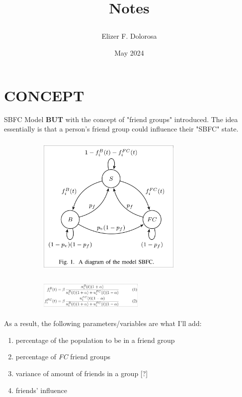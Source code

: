 \documentclass{article}
\title{

  Notes
}
\author{Elizer F. Dolorosa}
\date{May 2024}
\begin{document}
\maketitle

\section{CONCEPT}
SBFC Model \textbf{BUT} with the concept of "friend groups" introduced. The idea essentially is that a person's friend group could influence their "SBFC" state.

\begin{figure}[h]
  \begin{subfigure}{0.57\textwidth}
    \includegraphics[align=c,width=6.9cm, height=7cm]{sbfc-diagram.png}
  \end{subfigure}
  \begin{subfigure}{0.42\textwidth}
    \includegraphics[align=c,width=5cm, height=1.5cm]{transmission-eq.png}
  \end{subfigure}
\end{figure}

As a result, the following parameters/variables are what I'll add:
\begin{enumerate}
  \item percentage of the population to be in a friend group
  \item percentage of \textit{FC} friend groups
  \item variance of amount of friends in a group [?]
  \item friends' influence
\end{enumerate}
\end{document}
